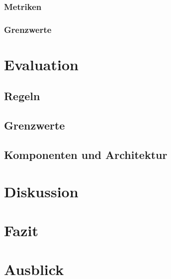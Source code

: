 \documentclass[a4paper,12pt]{scrartcl}
\begin{document}
\subsubsection{Metriken}
\subsubsection{Grenzwerte}

\section{Evaluation}
\subsection{Regeln}
\subsection{Grenzwerte}
\subsection{Komponenten und Architektur}

\section{Diskussion}

\section{Fazit}

\section{Ausblick}
\end{document}
